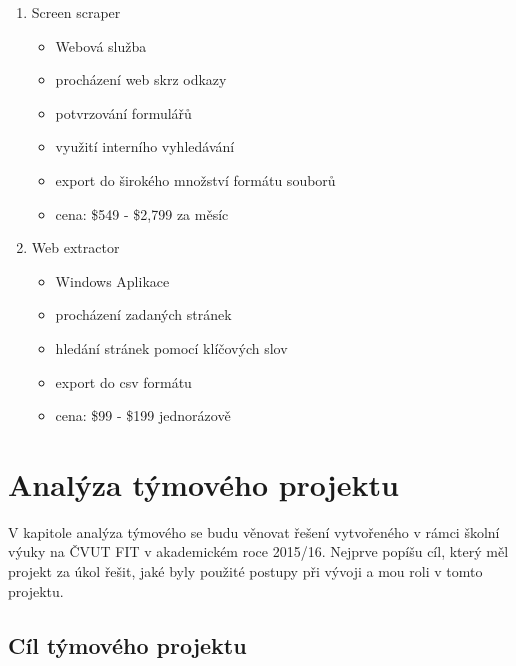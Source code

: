 \documentclass[thesis=B,czech]{FITthesis}[2012/06/26]
\begin{document}
\begin{enumerate}
\item Screen scraper \cite{ScreenScraper}

  \begin{itemize}
    \item Webová služba
    \item procházení web skrz odkazy
    \item potvrzování formulářů
    \item využití interního vyhledávání
    \item export do širokého množství formátu souborů
    \item cena: \$549 - \$2,799 za měsíc
  \end{itemize}
  
\item Web extractor \cite{WebExtractor}

  \begin{itemize}
    \item Windows Aplikace
    \item procházení zadaných stránek
    \item hledání stránek pomocí klíčových slov
    \item export do csv formátu
    \item cena: \$99 - \$199 jednorázově
  \end{itemize}


\end{enumerate}

\newpage

\chapter{Analýza týmového projektu}
V kapitole analýza týmového se budu věnovat řešení vytvořeného v rámci školní výuky na ČVUT FIT v akademickém roce 2015/16.
Nejprve popíšu cíl, který měl projekt za úkol řešit, jaké byly použité postupy při vývoji a mou roli v tomto projektu.

\section{Cíl týmového projektu}
\end{document}
